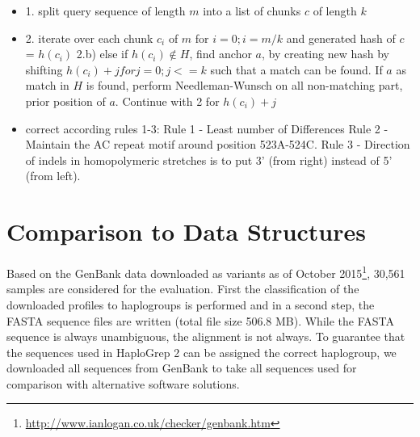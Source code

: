 \begin{itemize}
\item 1. split query sequence of length $m$ into a list of chunks $c$ of length $k$
\item 2. iterate over each chunk $c_i$ of $m$ for $i=0; i= m/k$ and generated hash of $c$ = $h(c_i)$
\subitem 2.b) else if $h(c_i) \notin H$, find anchor $a$, by creating new hash by shifting    $h(c_i)+j for j =0; j<=k$ such that a match can be found. If $a$ as match in $H$ is found, perform Needleman-Wunsch on all non-matching part, prior position of $a$. Continue with 2 for $h(c_i)+j$
\item correct according rules 1-3: 
\subitem  Rule 1 - Least number of Differences
\subitem Rule 2 - Maintain the AC repeat motif around position 523A-524C.
\subitem Rule 3 - Direction of indels in homopolymeric stretches is  to put  3’ (from right) instead of 5’ (from left). 
\end{itemize}

\section{Comparison to Data Structures}
Based on the GenBank data downloaded as variants as of October 2015\footnote{\url{http://www.ianlogan.co.uk/checker/genbank.htm}},  30,561 samples are considered for the evaluation. First the classification of the downloaded profiles to haplogroups is performed and in a second step, the FASTA sequence files are written (total file size 506.8 MB). While the FASTA sequence is always unambiguous, the alignment is not always. To guarantee that the sequences used in HaploGrep 2 can be assigned the correct haplogroup, we downloaded all sequences from GenBank to take all sequences used for comparison with alternative software solutions.

